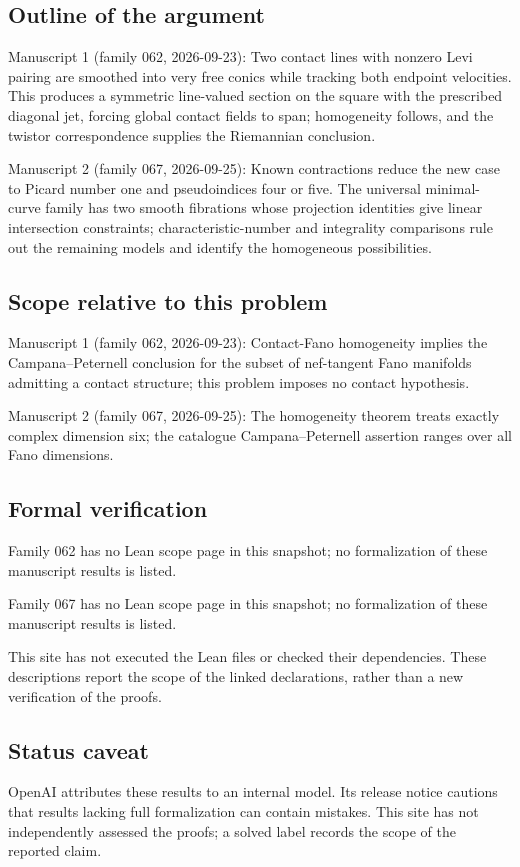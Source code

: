 \documentclass[11pt]{article}
\begin{document}
\subsection{Outline of the argument}
Manuscript 1 (family 062, 2026-09-23): Two contact lines with nonzero Levi pairing are smoothed into very free conics while tracking both endpoint velocities. This produces a symmetric line-valued section on the square with the prescribed diagonal jet, forcing global contact fields to span; homogeneity follows, and the twistor correspondence supplies the Riemannian conclusion.

Manuscript 2 (family 067, 2026-09-25): Known contractions reduce the new case to Picard number one and pseudoindices four or five. The universal minimal-curve family has two smooth fibrations whose projection identities give linear intersection constraints; characteristic-number and integrality comparisons rule out the remaining models and identify the homogeneous possibilities.

\subsection{Scope relative to this problem}
Manuscript 1 (family 062, 2026-09-23): Contact-Fano homogeneity implies the Campana–Peternell conclusion for the subset of nef-tangent Fano manifolds admitting a contact structure; this problem imposes no contact hypothesis.

Manuscript 2 (family 067, 2026-09-25): The homogeneity theorem treats exactly complex dimension six; the catalogue Campana–Peternell assertion ranges over all Fano dimensions.

\subsection{Formal verification}
Family 062 has no Lean scope page in this snapshot; no formalization of these manuscript results is listed.

Family 067 has no Lean scope page in this snapshot; no formalization of these manuscript results is listed.

This site has not executed the Lean files or checked their dependencies. These descriptions report the scope of the linked declarations, rather than a new verification of the proofs.

\subsection{Status caveat}
OpenAI attributes these results to an internal model. Its release notice cautions that results lacking full formalization can contain mistakes. This site has not independently assessed the proofs; a solved label records the scope of the reported claim.
\end{document}
